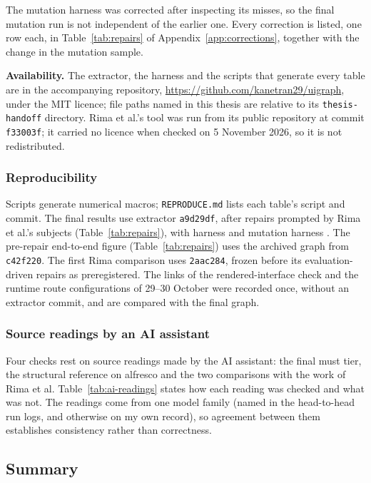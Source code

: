 The mutation harness was corrected after inspecting its misses, so the final mutation run is not
independent of the earlier one. Every correction is listed, one
row each, in Table~\ref{tab:repairs} of Appendix~\ref{app:corrections}, together with the change in
the mutation sample.

\textbf{Availability.} The extractor, the harness and the scripts that generate every table are in
the accompanying repository, \url{https://github.com/kanetran29/uigraph}, under the MIT licence;
file paths named in this thesis are relative to its \texttt{thesis-handoff} directory. Rima et al.'s tool was run from its public repository at commit \texttt{f33003f}; it carried no licence when checked on 5 November 2026, so it is not redistributed.

\subsubsection{Reproducibility}
\label{sec:reproducibility}

Scripts generate numerical macros; \texttt{REPRODUCE.md} lists each table's script and commit.
The final results use extractor \texttt{a9d29df}, after repairs prompted by Rima et al.'s subjects
(Table~\ref{tab:repairs}), with harness \HarnessVersion{} and mutation harness \HarnessVersionMutation{}.
The pre-repair end-to-end figure
(Table~\ref{tab:repairs}) uses the archived graph from \texttt{c42f220}. The first Rima comparison
uses \texttt{2aac284}, frozen before its evaluation-driven repairs as preregistered.
The links of the rendered-interface check and the runtime route configurations of 29--30 October
were recorded once, without an extractor commit, and are compared with the final graph.

\subsubsection{Source readings by an AI assistant}
\label{sec:ai-readings}

Four checks rest on source readings made by the AI assistant: the final must tier, the structural
reference on alfresco and the two comparisons with the work of Rima et al.
Table~\ref{tab:ai-readings} states how each reading was checked and what was not. The readings
come from one model family (named in the head-to-head run logs, and otherwise on my own record), so agreement between them establishes consistency rather
than correctness.


\subsection{Summary}
\label{sec:eval-summary}

